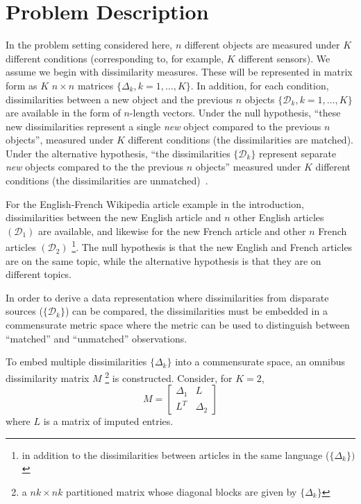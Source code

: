 \documentclass[12pt,oneside,final]{thesis}
\begin{document}
\section{Problem Description \label{sec:jointembed}}
In the problem setting considered here,  $n$ different objects are measured under $K$ different conditions (corresponding  to, for example, $K$ different sensors). We assume we begin with dissimilarity measures. These will be represented in matrix form as $K$ $n \times n$ matrices $\{\Delta_k,k=1 ,\ldots,K\}$.  In addition, for each condition, dissimilarities between  a new object  and the previous 
$n$ objects $\{\mathcal{D}_k,k=1 ,\ldots,K\}$ are available in the form of $n$-length vectors. Under  the null hypothesis, ``these new dissimilarities represent a single \emph{new} object  compared to the previous $n$ objects'', measured under $K$ different conditions (the dissimilarities are matched). Under the alternative hypothesis, ``the dissimilarities $\{\mathcal{D}_k\}$ represent separate \emph{new} objects compared to the the previous $n$ objects''  measured under $K$ different conditions (the dissimilarities are unmatched)~\cite{JOFC}. %

For the English-French Wikipedia  article example in the introduction,  dissimilarities between the new English article and $n$ other English articles $(\mathcal{D}_1)$ are available, and likewise for the new French article  and other $n$ French articles $(\mathcal{D}_2)$ \footnote{in addition to the dissimilarities between articles in the same language  ($\{\Delta_k\})$ }. The null hypothesis is that the new English and French articles are on the same topic, while the alternative hypothesis is that they are on different topics.

  In order to derive a data representation where dissimilarities from disparate sources ($\{\mathcal{D}_k\}$)  can be compared, the dissimilarities must be embedded in a commensurate metric space where the metric can be used to distinguish between ``matched'' and ``unmatched'' observations.


To embed multiple dissimilarities  $\{\Delta_k\}$  into a commensurate space, an omnibus dissimilarity matrix  $M$ \footnote{a $nk \times nk$ partitioned matrix whose diagonal blocks are given by $\{\Delta_k\}$ }  is constructed. Consider, for $K=2$,
 \begin{equation}
M=  \left[ \begin{array}{cc}
         \Delta_1 & L\\
        L^T  & \Delta_2 
     \end{array}  \right]     \label{omnibus} 
\end{equation} where $L$ is a matrix of imputed entries.
\end{document}
